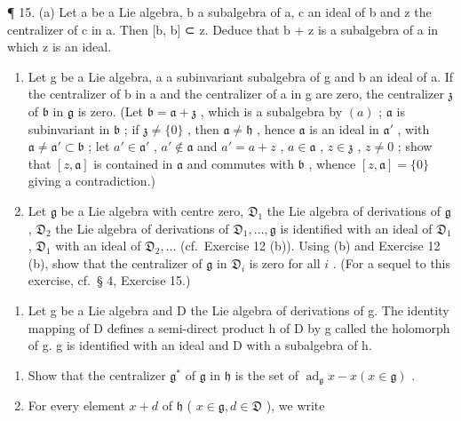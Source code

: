 ¶ 15. (a) Let a be a Lie algebra, b a subalgebra of a, c an ideal of b and z the centralizer of c in a. Then {[}b, b{]} ⊂ z. Deduce that b + z is a subalgebra of a in which z is an ideal.

\begin{enumerate}
\def\labelenumi{(\alph{enumi})}
\setcounter{enumi}{1}
\item
  Let g be a Lie algebra, a a subinvariant subalgebra of g and b an ideal of a. If the centralizer of b in a and the centralizer of a in g are zero, the centralizer \(\mathfrak{z}\) of \(\mathfrak{b}\) in \(\mathfrak{g}\) is zero. (Let \(\mathfrak{b} = \mathfrak{a} + \mathfrak{z}\) , which is a subalgebra by \((a)\) ; \(\mathfrak{a}\) is subinvariant in \(\mathfrak{b}\) ; if \(\mathfrak{z} \neq \{0\}\) , then \(\mathfrak{a} \neq \mathfrak{h}\) , hence \(\mathfrak{a}\) is an ideal in \(\mathfrak{a}'\) , with \(\mathfrak{a} \neq \mathfrak{a}' \subset \mathfrak{b}\) ; let \(a' \in \mathfrak{a}'\) , \(a' \notin \mathfrak{a}\) and \(a' = a + z\) , \(a \in \mathfrak{a}\) , \(z \in \mathfrak{z}\) , \(z \neq 0\) ; show that \([z, \mathfrak{a}]\) is contained in \(\mathfrak{a}\) and commutes with \(\mathfrak{b}\) , whence \([z, \mathfrak{a}] = \{0\}\) giving a contradiction.)
\item
  Let \(\mathfrak{g}\) be a Lie algebra with centre zero, \(\mathfrak{D}_1\) the Lie algebra of derivations of \(\mathfrak{g}\) , \(\mathfrak{D}_2\) the Lie algebra of derivations of \(\mathfrak{D}_1, \ldots, \mathfrak{g}\) is identified with an ideal of \(\mathfrak{D}_1\) , \(\mathfrak{D}_1\) with an ideal of \(\mathfrak{D}_2, \ldots\) (cf.~Exercise 12 (b)). Using (b) and Exercise 12 (b), show that the centralizer of \(\mathfrak{g}\) in \(\mathfrak{D}_i\) is zero for all \(i\) . (For a sequel to this exercise, cf.~§ 4, Exercise 15.)
\end{enumerate}

\begin{enumerate}
\def\labelenumi{\arabic{enumi}.}
\setcounter{enumi}{15}
\tightlist
\item
  Let g be a Lie algebra and D the Lie algebra of derivations of g. The identity mapping of D defines a semi-direct product h of D by g called the holomorph of g. g is identified with an ideal and D with a subalgebra of h.
\end{enumerate}

\begin{enumerate}
\def\labelenumi{(\alph{enumi})}
\item
  Show that the centralizer \(\mathfrak{g}^*\) of \(\mathfrak{g}\) in \(\mathfrak{h}\) is the set of \(\operatorname{ad}_{\mathfrak{g}}x - x(x\in \mathfrak{g})\) .
\item
  For every element \(x + d\) of \(\mathfrak{h}\) ( \(x \in \mathfrak{g}, d \in \mathfrak{D}\) ), we write
\end{enumerate}

